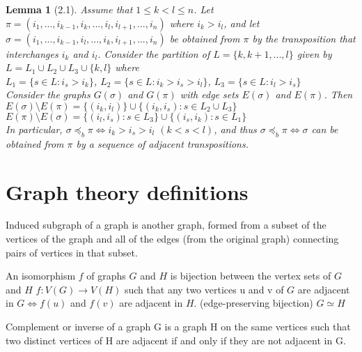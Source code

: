 \documentclass{article}
\newtheorem*{lemma}{Lemma}
\begin{document}
\begin{lemma}[2.1]
    Assume that $1 \leq k < l \leq n$. Let $\pi = (i_1, ..., i_{k-1}, i_k, ..., i_l, i_{l+1}, ..., i_n)$ where $i_k > i_l$, and let $\sigma = (i_1, ..., i_{k-1}, i_l, ..., i_k, i_{l+1}, ..., i_n)$ be obtained from $\pi$ by the transposition that interchanges $i_k$ and $i_l$. Consider the partition of $L = \{ k, k+1, ..., l \}$ given by $L = L_1 \cup L_2 \cup L_3 \cup  \{ k, l \}$ where \\
    $L_1 = \{ s \in L: i_s > i_k \}$, $L_2 = \{ s \in L: i_k > i_s > i_l \}$, $L_3 = \{ s \in L: i_l > i_s \}$ \\
    Consider the graphs $G(\sigma)$ and $G(\pi)$ with edge sets $E(\sigma)$ and $E(\pi)$. Then \\
    $E(\sigma) \setminus E(\pi) = \{ (i_k, i_l) \} \cup \{ (i_k, i_s): s \in L_2 \cup L_3 \}$ \\
    $E(\pi) \setminus E(\sigma) = \{ (i_l, i_s): s \in L_3 \} \cup \{ (i_s, i_k): s \in L_1 \}$ \\
    In particular, $\sigma \preceq_b \pi \Leftrightarrow i_k > i_s > i_l$  $(k < s < l)$, and thus $\sigma \preceq_b \pi \Leftrightarrow \sigma$ can be obtained from $\pi$ by a sequence of adjacent transpositions.

\end{lemma}
















\section{ Graph theory definitions }
Induced subgraph of a graph is another graph, formed from a subset of the vertices of the graph and all of the edges (from the original graph) connecting pairs of vertices in that subset.

An isomorphism $f$ of graphs $G$ and $H$ is bijection between the vertex sets of $G$ and $H$ $f: V(G) \rightarrow V(H)$ such that any two vertices u and v of $G$ are adjacent in $G \Leftrightarrow f(u)$ and $f(v)$ are adjacent in $H$. (edge-preserving bijection) $G \simeq H$

Complement or inverse of a graph G is a graph H on the same vertices such that two distinct vertices of H are adjacent if and only if they are not adjacent in G.
\end{document}

